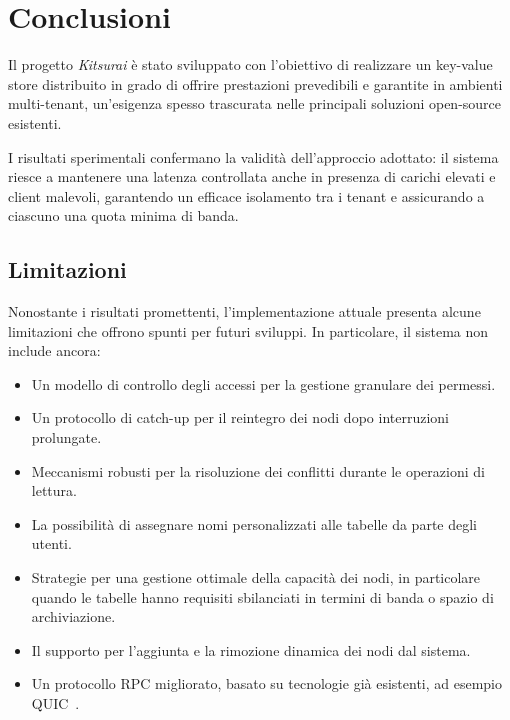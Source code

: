 \section{Conclusioni}
\label{sec:conclusioni}

Il progetto \textit{Kitsurai} è stato sviluppato con l'obiettivo di realizzare un key-value store distribuito in grado di offrire prestazioni prevedibili e garantite in ambienti multi-tenant, un'esigenza spesso trascurata nelle principali soluzioni open-source esistenti.

I risultati sperimentali confermano la validità dell'approccio adottato: il sistema riesce a mantenere una latenza controllata anche in presenza di carichi elevati e client malevoli, garantendo un efficace isolamento tra i tenant e assicurando a ciascuno una quota minima di banda.

\subsection{Limitazioni}
\label{subsec:limitazioni}

Nonostante i risultati promettenti, l'implementazione attuale presenta alcune limitazioni che offrono spunti per futuri sviluppi. In particolare, il sistema non include ancora:

\begin{itemize}
    \item Un modello di controllo degli accessi per la gestione granulare dei permessi.
    \item Un protocollo di catch-up per il reintegro dei nodi dopo interruzioni prolungate.
    \item Meccanismi robusti per la risoluzione dei conflitti durante le operazioni di lettura.
    \item La possibilità di assegnare nomi personalizzati alle tabelle da parte degli utenti.
    \item Strategie per una gestione ottimale della capacità dei nodi, in particolare quando le tabelle hanno requisiti sbilanciati in termini di banda o spazio di archiviazione.
    \item Il supporto per l'aggiunta e la rimozione dinamica dei nodi dal sistema.
    \item Un protocollo RPC migliorato, basato su tecnologie già esistenti, ad esempio QUIC~\cite{QUIC}.
\end{itemize}
